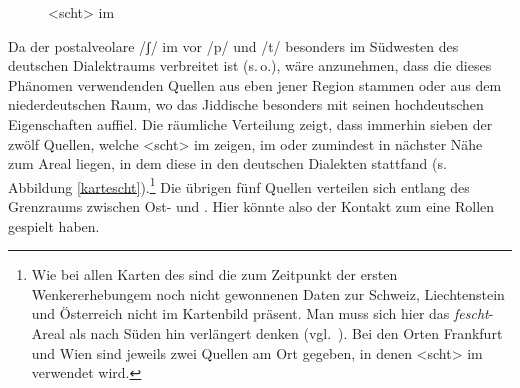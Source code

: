 {  %
\begin{figure}
	\caption{<scht> im }
	\label{<scht>}	
\end{figure}



Da der postalveolare  /ʃ/ im  vor /p/ und /t/ besonders im Südwesten des deutschen Dialektraums verbreitet ist (s.\,o.), wäre anzunehmen, dass die dieses Phänomen verwendenden Quellen aus eben jener Region stammen oder aus dem niederdeutschen Raum, wo das Jiddische besonders mit seinen hochdeutschen Eigenschaften auffiel. Die räumliche Verteilung zeigt, dass immerhin sieben der zwölf Quellen, welche <scht> im  zeigen, im oder zumindest in nächster Nähe zum Areal liegen, in dem diese  in den deutschen Dialekten stattfand (s. Abbildung \ref{kartescht}).\footnote{Wie bei allen Karten des  sind die zum  Zeitpunkt der ersten Wenkererhebungem noch nicht gewonnenen Daten zur Schweiz, Liechtenstein und Österreich nicht im Kartenbild präsent. Man muss sich hier das \textit{fescht}-Areal als nach Süden hin verlängert denken (vgl.\, \citealt[361]{Schirmunski1962}). Bei den Orten Frankfurt und Wien sind jeweils zwei Quellen am Ort gegeben, in denen <scht> im  verwendet wird.} Die übrigen fünf Quellen verteilen sich entlang des Grenzraums zwischen Ost- und . Hier könnte also der Kontakt zum \hai{{\OJ}} eine Rollen gespielt haben.

}
